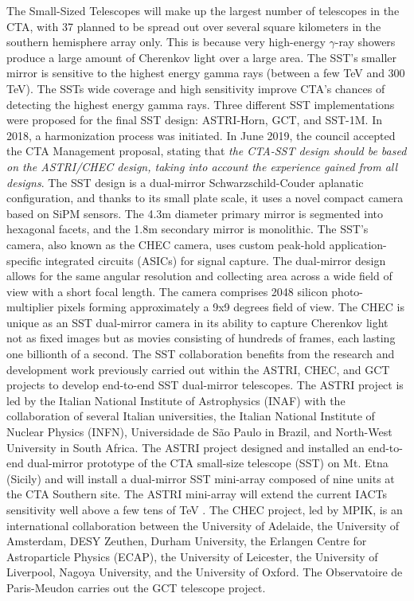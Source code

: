 The Small-Sized Telescopes will make up the largest number of telescopes in the CTA, with 37 planned to be spread out over several square kilometers in the southern hemisphere array only. This is because very high-energy $\gamma$-ray showers produce a large amount of Cherenkov light over a large area. The SST's smaller mirror is sensitive to the highest energy gamma rays (between a few TeV and 300 TeV). The SSTs wide coverage and high sensitivity improve CTA's chances of detecting the highest energy gamma rays. Three different SST implementations were proposed for the final SST design: ASTRI-Horn, GCT, and SST-1M. In 2018, a harmonization process was initiated. In June 2019, the council accepted the CTA Management proposal, stating that \textit{the CTA-SST design should be based on the ASTRI/CHEC design, taking into account the experience gained from all designs}. The SST design is a dual-mirror Schwarzschild-Couder aplanatic configuration, and thanks to its small plate scale, it uses a novel compact camera based on SiPM sensors. The 4.3m diameter primary mirror is segmented into hexagonal facets, and the 1.8m secondary mirror is monolithic. The SST's camera, also known as the CHEC camera, uses custom peak-hold application-specific integrated circuits (ASICs) for signal capture. The dual-mirror design allows for the same angular resolution and collecting area across a wide field of view with a short focal length. The camera comprises 2048 silicon photo-multiplier pixels forming approximately a 9x9 degrees field of view. The CHEC is unique as an SST dual-mirror camera in its ability to capture Cherenkov light not as fixed images but as movies consisting of hundreds of frames, each lasting one billionth of a second. The SST collaboration benefits from the research and development work previously carried out within the ASTRI, CHEC, and GCT projects to develop end-to-end SST dual-mirror telescopes. The ASTRI project is led by the Italian National Institute of Astrophysics (INAF) with the collaboration of several Italian universities, the Italian National Institute of Nuclear Physics (INFN), Universidade de São Paulo in Brazil, and North-West University in South Africa. 
The ASTRI project designed and installed an end-to-end dual-mirror prototype of the CTA small-size telescope (SST) on Mt. Etna (Sicily) and will install a dual-mirror SST mini-array composed of nine units at the CTA Southern site.
The ASTRI mini-array will extend the current IACTs sensitivity well above a few tens of TeV \cite{Vercellone_2016}. The CHEC project, led by MPIK, is an international collaboration between the University of Adelaide, the University of Amsterdam, DESY Zeuthen, Durham University, the Erlangen Centre for Astroparticle Physics (ECAP), the University of Leicester, the University of Liverpool, Nagoya University, and the University of Oxford. The Observatoire de Paris-Meudon carries out the GCT telescope project.

